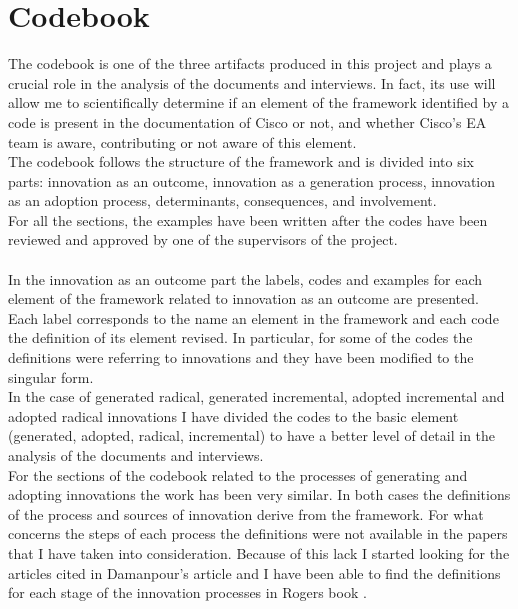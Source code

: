 \section{Codebook}

The codebook is one of the three artifacts produced in this project and plays a crucial role in the analysis of the documents and interviews.
In fact, its use will allow me to scientifically determine if an element of the framework identified by a code is present in the documentation of Cisco or not, and whether Cisco's EA team is aware, contributing or not aware of this element. \\
The codebook follows the structure of the framework and is divided into six parts: innovation as an outcome, innovation as a generation process, innovation as an adoption process, determinants, consequences, and involvement. \\
For all the sections, the examples have been written after the codes have been reviewed and approved by one of the supervisors of the project.
\\ \\ %
In the innovation as an outcome part the labels, codes and examples for each element of the framework related to innovation as an outcome are presented. Each label corresponds to the name an element in the framework and each code the definition of its element revised. In particular, for some of the codes the definitions were referring to innovations and they have been modified to the singular form. \\
In the case of generated radical, generated incremental, adopted incremental and adopted radical innovations I have divided the codes to the basic element (generated, adopted, radical, incremental) to have a better level of detail in the analysis of the documents and interviews.
\\ %
For the sections of the codebook related to the processes of generating and adopting innovations the work has been very similar. In both cases the definitions of the process and sources of innovation derive from the framework.
For what concerns the steps of each process the definitions were not available in the papers that I have taken into consideration. Because of this lack I started looking for the articles cited in Damanpour's article \citep{damanpour2006} and I have been able to find the definitions for each stage of the innovation processes in Rogers book \citep{rogers2003}. \\

